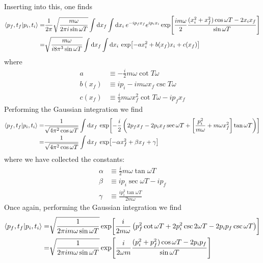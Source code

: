 \documentclass[a4paper,11pt]{article}
\begin{document}
Inserting into this, one finds
\begin{equation}
\begin{aligned}
\braket{p_f,t_f}{p_i,t_i}=&\frac{1}{2\pi}\sqrt{\frac{m\omega}{2\pi i \sin{\omega T}}}\int\dd x_f \int  \dd x_i \: e^{-ip_fx_f} e^{ip_ix_i} \exp[\frac{i m \omega}{2 }\frac{(x_i^2+x_f^2)\cos{\omega T}-2x_i x_f}{\sin{\omega T}}]\\
=&\sqrt{\frac{m\omega}{i 8\pi^3 \sin{\omega T}}}\int\dd x_f\int  \dd x_i \: \exp[-ax_i^2+b(x_f)x_i+c(x_f)]
\end{aligned}
\end{equation}
where 
\begin{equation}
\begin{aligned}
a&\equiv-\frac{i}{2}m\omega \cot{T \omega}\\
b(x_f)&\equiv ip_i-im\omega x_f \csc{T\omega}\\
c(x_f)&\equiv\frac{i}{2}m\omega x_f^2 \cot{T\omega}-ip_f x_f
\end{aligned}
\end{equation}
Performing the Gaussian integration we find
\begin{equation}
\begin{aligned}
\braket{p_f,t_f}{p_i,t_i}=&\frac{1}{\sqrt{4\pi^2\cos{\omega T}}}
\int\dd x_f \: \exp[-\frac{i}{2 }
\left(2p_fx_f-2p_ix_f\sec{\omega T}+\left[\frac{p_i^2}{m\omega}+m\omega x_f^2\right]\tan{\omega T}\right)
]\\
=&
\frac{1}{\sqrt{4\pi^2\cos{\omega T}}}
\int\dd x_f \: \exp[-\alpha x_f^2+\beta x_f+\gamma]
\end{aligned}
\end{equation}
where we have collected the constants:
\begin{equation}
\begin{aligned}
\alpha&\equiv\frac{i}{2}m\omega \tan{\omega T}\\
\beta&\equiv ip_i\sec{\omega T} -ip_f\\
\gamma&\equiv \frac{ip_i^2\tan{\omega T}}{2m\omega}
\end{aligned}
\end{equation}
Once again, performing the Gaussian integration we find
\begin{equation}
	\begin{aligned}
		\braket{p_f,t_f}{p_i,t_i}=&\sqrt{\frac{1}{2\pi im\omega \sin{\omega T}}}\exp[\frac{i}{2m\omega}\left(p_f^2\cot{\omega T}+2p_i^2\csc{2\omega T}-2p_ip_f\csc{\omega T}\right)]\\
		=&
		\sqrt{\frac{1}{2\pi im\omega \sin{\omega T}}}\exp[\frac{i}{2\omega m }\frac{(p_i^2+p_f^2)\cos{\omega T}-2p_i p_f}{\sin{\omega T}}]
	\end{aligned}
\end{equation}
\end{document}
